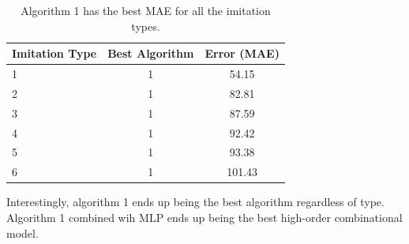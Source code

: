 \begin{table}[center]
	\centering
	\begin{center}
		\begin{tabular}{|l|c|c|} \hline
			\textbf{Imitation Type}	& \textbf{Best Algorithm}	&	\textbf{Error (MAE)}	\\ \hline \hline
			1			& 1				&	54.15			\\ \hline
			2			& 1				&	82.81			\\ \hline
			3			& 1				&	87.59			\\ \hline
			4			& 1				&	92.42			\\ \hline
			5			& 1				&	93.38			\\ \hline
			6			& 1				&	101.43			\\ \hline
		\end{tabular}
	\end{center}
	\caption{Algorithm 1 has the best MAE for all the imitation types.}
	\label{tab:best-for-each}
\end{table}

Interestingly, algorithm 1 ends up being the best algorithm regardless of type. Algorithm 1 combined wih MLP ends up being the best high-order combinational model. 

